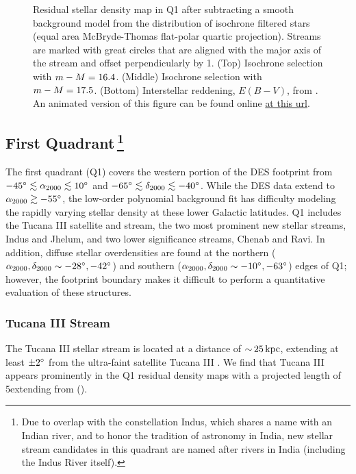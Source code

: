 \documentclass[twocolumn]{aastex61}
\begin{document}
\begin{figure}[]
  \caption{Residual stellar density map in Q1 after subtracting a smooth background model from the distribution of isochrone filtered stars (equal area McBryde-Thomas flat-polar quartic projection). 
    Streams are marked with great circles that are aligned with the major axis of the stream and offset perpendicularly by 1.
(Top) Isochrone selection with $m - M = 16.4$. 
(Middle) Isochrone selection with $m - M = 17.5$. 
(Bottom) Interstellar reddening, $E(B-V)$, from \citet{Schlegel:1998}.
    An animated version of this figure can be found online \href{http://home.fnal.gov/~kadrlica/movies/residual_q1_v17p2_label.gif}{at this url}.
}
  \label{fig:q1}
\end{figure}

\subsection{First Quadrant\,\footnote{
Due to overlap with the constellation Indus, which shares a name with an Indian river, and to honor the tradition of astronomy in India, new stellar stream candidates in this quadrant are named after rivers in India (including the Indus River itself).
}}
\label{sec:q1}

The first quadrant (Q1) covers the western portion of the DES footprint from $-45{}^{\circ} \lesssim {\ensuremath{\alpha_{2000}}} \lesssim 10{}^{\circ}$ and $-65{}^{\circ} \lesssim {\ensuremath{\delta_{2000}}} \lesssim -40{}^{\circ}$.
While the DES data extend to ${\alpha_{2000}} \gtrsim -55{}^{\circ}$, the low-order polynomial background fit has difficulty modeling the rapidly varying stellar density at these lower Galactic latitudes.
Q1 includes the Tucana III satellite and stream, the two most prominent new stellar streams, Indus and Jhelum, and two lower significance streams, Chenab and Ravi.
In addition, diffuse stellar overdensities are found at the northern (${\alpha_{2000}},{\delta_{2000}} \sim -28{}^{\circ},-42{}^{\circ}$) and southern (${\alpha_{2000}},{\delta_{2000}} \sim -10{}^{\circ}, -63{}^{\circ}$) edges of Q1; however, the footprint boundary makes it difficult to perform a quantitative evaluation of these structures.

\subsubsection{Tucana III Stream}
\label{sec:tuc}

The Tucana III stellar stream is located at a distance of $ {\sim}\, 25 \mathrm{\,kpc}$, extending at least $\pm 2{}^{\circ}$ from the ultra-faint satellite Tucana III \citep{Drlica-Wagner:2015}. 
We find that Tucana III appears prominently in the Q1 residual density maps with a projected length of 5\degrees extending from  ().
\end{document}
